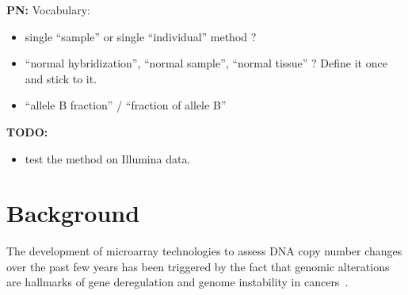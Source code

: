 \documentclass[10pt]{bmc_article}
\newenvironment{bmcformat}{\fussy\setboolean{publ}{true}}{\fussy}
\newenvironment{TODO}{\color{red}\textbf{TODO:}}{}
\newenvironment{PN}{\color{blue}\textbf{PN:}}{}
\begin{document}
\begin{bmcformat}

  \begin{PN}
Vocabulary:
    \begin{itemize}
    \item single ``sample'' or single ``individual'' method ?
    \item ``normal hybridization'', ``normal sample'', ``normal tissue'' ? Define it once and stick to it.
    \item ``allele B fraction'' / ``fraction of allele B''
 \end{itemize}
  \end{PN}

  \begin{TODO}
    \begin{itemize}
    \item test the method on Illumina data.
    \end{itemize}
  \end{TODO}


\section*{Background}
\label{secBackground}

The development of microarray technologies to assess DNA copy number changes over the past few years has been triggered by the fact that genomic alterations are hallmarks of gene deregulation and genome instability in cancers~\cite{albertson03chromosome,hanahan00the-hallmarks}. 


\end{bmcformat}
\end{document}
